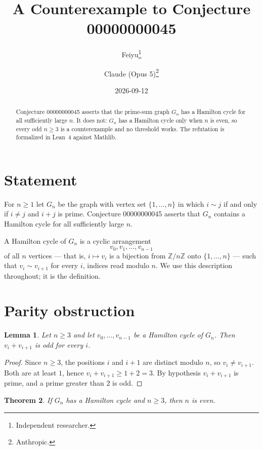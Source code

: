 \documentclass[11pt]{article}
\title{A Counterexample to Conjecture 00000000045}
\author{%
  Feiyu\thanks{Independent researcher.}
  \and
  Claude (Opus 5)\thanks{Anthropic.}%
}
\date{2026-09-12}
\theoremstyle{plain}
\newtheorem{theorem}{Theorem}
\newtheorem{lemma}[theorem]{Lemma}
\theoremstyle{remark}
\begin{document}
\maketitle

\begin{abstract}
Conjecture 00000000045 asserts that the prime-sum graph $G_n$ has a Hamilton
cycle for all sufficiently large $n$. It does not: $G_n$ has a Hamilton cycle
only when $n$ is even, so every odd $n\ge3$ is a counterexample and no
threshold works. The refutation is formalized in Lean~4 against Mathlib.
\end{abstract}

\section{Statement}

For $n\ge1$ let $G_n$ be the graph with vertex set $\{1,\ldots,n\}$ in which
$i\sim j$ if and only if $i\ne j$ and $i+j$ is prime. Conjecture 00000000045
asserts that $G_n$ contains a Hamilton cycle for all sufficiently large $n$.

A Hamilton cycle of $G_n$ is a cyclic arrangement
\[
  v_0,v_1,\ldots,v_{n-1}
\]
of all $n$ vertices --- that is, $i\mapsto v_i$ is a bijection from
$\mathbb Z/n\mathbb Z$ onto $\{1,\ldots,n\}$ --- such that $v_i\sim v_{i+1}$ for
every $i$, indices read modulo $n$. We use this description throughout; it is
the definition.

\section{Parity obstruction}

\begin{lemma}\label{lem:odd}
Let $n\ge3$ and let $v_0,\ldots,v_{n-1}$ be a Hamilton cycle of $G_n$. Then
$v_i+v_{i+1}$ is odd for every $i$.
\end{lemma}

\begin{proof}
Since $n\ge3$, the positions $i$ and $i+1$ are distinct modulo $n$, so
$v_i\ne v_{i+1}$. Both are at least $1$, hence $v_i+v_{i+1}\ge1+2=3$. By
hypothesis $v_i+v_{i+1}$ is prime, and a prime greater than $2$ is odd.
\end{proof}

\begin{theorem}\label{thm:even}
If $G_n$ has a Hamilton cycle and $n\ge3$, then $n$ is even.
\end{theorem}
\end{document}
